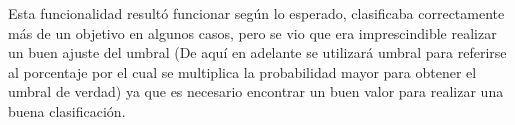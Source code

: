 
Esta funcionalidad resultó funcionar según lo esperado, clasificaba
correctamente más de un objetivo en algunos casos, pero se vio que era
imprescindible realizar un buen ajuste del umbral (De aquí en adelante se
utilizará umbral para referirse al porcentaje por el cual se multiplica la
probabilidad mayor para obtener el umbral de verdad) ya que es necesario
encontrar un buen valor para realizar una buena clasificación.

